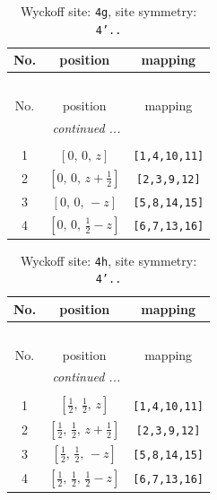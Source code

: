 \documentclass[fleqn,8pt]{jsarticle}
\begin{document}
\renewcommand{\arraystretch}{1.2}
\begin{longtable}{ccc}
\caption{Wyckoff site: {\tt 4g}, site symmetry: {\tt 4'..}}
 \\
 \hline \hline
No. & position & mapping \\ \hline \endfirsthead

\multicolumn{2}{l}{\tablename\ \thetable{}} \\
 \hline \hline
No. & position & mapping \\ \hline \endhead

 \hline \hline
\multicolumn{2}{r}{\footnotesize\it continued ...} \\ \endfoot

 \hline \hline
\multicolumn{2}{r}{} \\ \endlastfoot

1 & $\left[ 0,\, 0,\, z \right]$ & {\tt [1,4,10,11]} \\ \hline
2 & $\left[ 0,\, 0,\, z + \frac{1}{2} \right]$ & {\tt [2,3,9,12]} \\ \hline
3 & $\left[ 0,\, 0,\, - z \right]$ & {\tt [5,8,14,15]} \\ \hline
4 & $\left[ 0,\, 0,\, \frac{1}{2} - z \right]$ & {\tt [6,7,13,16]} \\
\end{longtable}
\renewcommand{\arraystretch}{1.2}
\begin{longtable}{ccc}
\caption{Wyckoff site: {\tt 4h}, site symmetry: {\tt 4'..}}
 \\
 \hline \hline
No. & position & mapping \\ \hline \endfirsthead

\multicolumn{2}{l}{\tablename\ \thetable{}} \\
 \hline \hline
No. & position & mapping \\ \hline \endhead

 \hline \hline
\multicolumn{2}{r}{\footnotesize\it continued ...} \\ \endfoot

 \hline \hline
\multicolumn{2}{r}{} \\ \endlastfoot

1 & $\left[ \frac{1}{2},\, \frac{1}{2},\, z \right]$ & {\tt [1,4,10,11]} \\ \hline
2 & $\left[ \frac{1}{2},\, \frac{1}{2},\, z + \frac{1}{2} \right]$ & {\tt [2,3,9,12]} \\ \hline
3 & $\left[ \frac{1}{2},\, \frac{1}{2},\, - z \right]$ & {\tt [5,8,14,15]} \\ \hline
4 & $\left[ \frac{1}{2},\, \frac{1}{2},\, \frac{1}{2} - z \right]$ & {\tt [6,7,13,16]} \\
\end{longtable}
\end{document}
